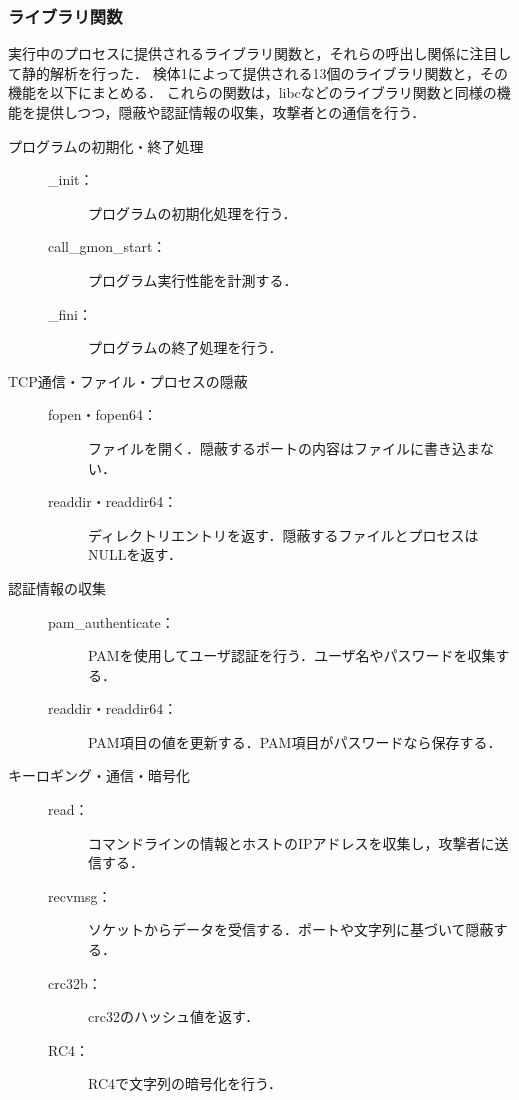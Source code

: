 \documentclass[submit,techreq,noauthor]{eco}	%
\begin{document}
\subsubsection{ライブラリ関数}
実行中のプロセスに提供されるライブラリ関数と，それらの呼出し関係に注目して静的解析を行った．
検体1によって提供される13個のライブラリ関数と，その機能を以下にまとめる．
これらの関数は，libcなどのライブラリ関数と同様の機能を提供しつつ，隠蔽や認証情報の収集，攻撃者との通信を行う．
\begin{description}

  \item [プログラムの初期化・終了処理] \mbox{}
  \begin{description}
    \item[\_init：] プログラムの初期化処理を行う．
    \item[call\_gmon\_start：] プログラム実行性能を計測する．
    \item[\_fini：]プログラムの終了処理を行う．
  \end{description}

  \item [TCP通信・ファイル・プロセスの隠蔽] \mbox{}
  \begin{description}
    \item[fopen・fopen64：] ファイルを開く．隠蔽するポートの内容はファイルに書き込まない．
    \item[readdir・readdir64：] ディレクトリエントリを返す．隠蔽するファイルとプロセスはNULLを返す．
  \end{description}

    \item [認証情報の収集] \mbox{}
  \begin{description}
    \item[pam\_authenticate：] PAMを使用してユーザ認証を行う．ユーザ名やパスワードを収集する．
    \item[readdir・readdir64：] PAM項目の値を更新する．PAM項目がパスワードなら保存する．\\
  \end{description}

  \item [キーロギング・通信・暗号化] \mbox{}
  \begin{description}
    \item[read：] コマンドラインの情報とホストのIPアドレスを収集し，攻撃者に送信する．
    \item[recvmsg：]ソケットからデータを受信する．ポートや文字列に基づいて隠蔽する．
    \item[crc32b：] crc32のハッシュ値を返す．
    \item[RC4：] RC4で文字列の暗号化を行う．\\
  \end{description}
\end{description}
\end{document}
